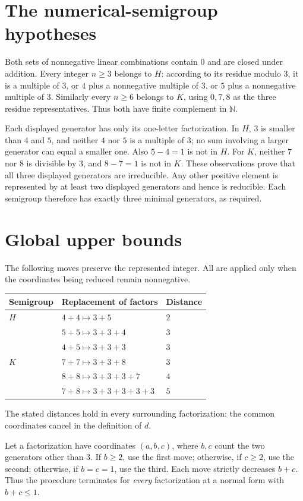\documentclass[11pt]{article}
\newcommand{\N}{\mathbb N}
\begin{document}
\section{The numerical-semigroup hypotheses}
Both sets of nonnegative linear combinations contain $0$ and are closed
under addition. Every integer $n\ge3$ belongs to $H$: according to its
residue modulo $3$, it is a multiple of $3$, or $4$ plus a nonnegative
multiple of $3$, or $5$ plus a nonnegative multiple of $3$.
Similarly every $n\ge6$ belongs to $K$, using $0,7,8$ as the three residue
representatives. Thus both have finite complement in $\N$.

Each displayed generator has only its one-letter factorization. In $H$,
$3$ is smaller than $4$ and $5$, and neither $4$ nor $5$ is a multiple of $3$;
no sum involving a larger generator can equal a smaller one. Also $5-4=1$
is not in $H$. For $K$, neither $7$ nor $8$ is divisible by $3$, and
$8-7=1$ is not in $K$. These observations prove that all three displayed
generators are irreducible. Any other positive element is represented by
at least two displayed generators and hence is reducible. Each semigroup
therefore has exactly three minimal generators, as required.

\section{Global upper bounds}
The following moves preserve the represented integer. All are applied only
when the coordinates being reduced remain nonnegative.
\begin{center}
\begin{tabular}{@{}lll@{}}
\toprule
Semigroup & Replacement of factors & Distance \\
\midrule
$H$ & $4+4\longmapsto3+5$ & $2$ \\
    & $5+5\longmapsto3+3+4$ & $3$ \\
    & $4+5\longmapsto3+3+3$ & $3$ \\
\addlinespace
$K$ & $7+7\longmapsto3+3+8$ & $3$ \\
    & $8+8\longmapsto3+3+3+7$ & $4$ \\
    & $7+8\longmapsto3+3+3+3+3$ & $5$ \\
\bottomrule
\end{tabular}
\end{center}
The stated distances hold in every surrounding factorization: the common
coordinates cancel in the definition of $d$.

Let a factorization have coordinates $(a,b,c)$, where $b,c$ count the two
generators other than $3$. If $b\ge2$, use the first move; otherwise, if
$c\ge2$, use the second; otherwise, if $b=c=1$, use the third.
Each move strictly decreases $b+c$. Thus the procedure terminates for
\emph{every} factorization at a normal form with $b+c\le1$.
\end{document}
